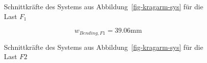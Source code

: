 \documentclass[
  12pt,
  letterpaper,
  egregdoesnotlikesansseriftitles]{scrreprt}
\begin{document}
\begin{figure}[H]


\caption{\label{fig-sk-kragarmf1}Schnittkräfte des Systems aus
Abbildung~\ref{fig-kragarm-sys} für die Last \(F_1\)}

\end{figure}%

\begin{equation}w_{Bending,F1} = 39.06 \text{mm}\end{equation}

\begin{figure}[H]


\caption{\label{fig-sk-kragarm-f2}Schnittkräfte des Systems aus
Abbildung~\ref{fig-kragarm-sys} für die Last \(F2\)}

\end{figure}%
\end{document}
